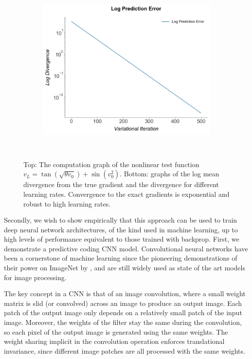 \begin{figure}
\begin{subfigure}{.5\linewidth}
\includegraphics[scale=0.25]{chapter_6_figures/numerics_proper_log_divergence.jpg}
\end{subfigure}\\[1ex]
\caption{Top: The computation graph of the nonlinear test function $v_{L} = \tan(\sqrt{\theta v_0}) + \sin(v_0^2)$. Bottom: graphs of the log mean divergence from the true gradient and the divergence for different learning rates. Convergence to the exact gradients is exponential and robust to high learning rates.}
\end{figure} \vspace{-0.2cm}

Secondly, we wish to show empirically that this approach can be used to train deep neural network architectures, of the kind used in machine learning, up to high levels of performance equivalent to those trained with backprop. First, we demonstrate a predictive coding CNN model. Convolutional neural networks have been a cornerstone of machine learning since the pioneering demonstrations of their power on ImageNet by \citep{krizhevsky2012imagenet}, and are still widely used as state of the art models for image processing. 

The key concept in a CNN is that of an image convolution, where a small weight matrix is slid (or convolved) across an image to produce an output image. Each patch of the output image only depends on a relatively small patch of the input image. Moreover, the weights of the filter stay the same during the convolution, so each pixel of the output image is generated using the same weights. The weight sharing implicit in the convolution operation enforces translational invariance, since different image patches are all processed with the same weights.

